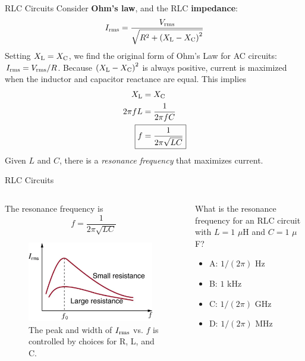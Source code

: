 \documentclass{beamer}
\begin{document}
\begin{frame}{RLC Circuits}
\small
Consider \textbf{\alert{Ohm's law}}, and the RLC \textbf{\alert{impedance}}:
\begin{equation}
I_{\rm rms} = \frac{V_{\rm rms}}{\sqrt{R^2 + \left(X_{\rm L} - X_{\rm C} \right)^2}}
\end{equation}
Setting $X_{\rm L} = X_{\rm C}$, we find the original form of Ohm's Law for AC circuits: $I_{\rm rms} = V_{\rm rms}/R$.  Because $\left(X_{\rm L} - X_{\rm C} \right)^2$ is always positive, current is maximized when the inductor and capacitor reactance are equal.  This implies
\begin{align}
X_{\rm L} &= X_{\rm C} \\
2\pi f L &= \frac{1}{2\pi f C} \\
\Aboxed{f &= \frac{1}{2\pi\sqrt{LC}}} \label{eq:f0}
\end{align}
Given $L$ and $C$, there is a \textit{resonance frequency} that maximizes current.
\end{frame}

\begin{frame}{RLC Circuits}
\begin{columns}[T]
\begin{column}{0.5\textwidth}
The resonance frequency is
\begin{equation}
f = \frac{1}{2\pi\sqrt{LC}}
\end{equation}
\begin{figure}
\centering
\includegraphics[width=0.95\textwidth]{figures/resonance.png}
\caption{\label{fig:resonance} The peak and width of $I_{\rm rms}$ vs. $f$ is controlled by choices for R, L, and C.}
\end{figure}
\end{column}
\begin{column}{0.5\textwidth}
What is the resonance frequency for an RLC circuit with $L = 1$ $\mu$H and $C = 1$ $\mu$F?
\begin{itemize}
\item A: $1/(2\pi)$ Hz
\item B: $1$ kHz
\item C: $1/(2\pi)$ GHz
\item D: $1/(2\pi)$ MHz
\end{itemize}
\end{column}
\end{columns}
\end{frame}
\end{document}
